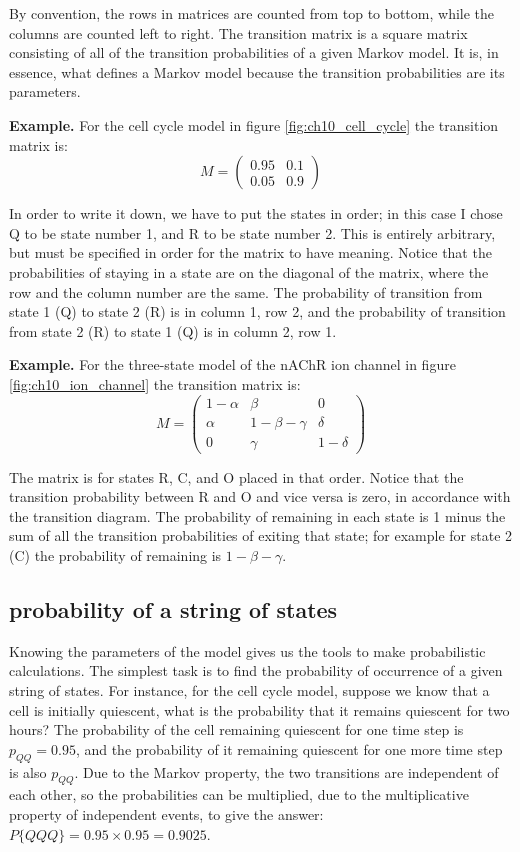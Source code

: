 \documentclass[
]{book}
\theoremstyle{definition}
\theoremstyle{definition}
\theoremstyle{definition}
\theoremstyle{remark}
\begin{document}
By convention, the rows in matrices are counted from top to bottom, while the columns are counted left to right. The transition matrix is a square matrix consisting of all of the transition probabilities of a given Markov model. It is, in essence, what defines a Markov model because the transition probabilities are its parameters.

\textbf{Example.} For the cell cycle model in figure \ref{fig:ch10_cell_cycle} the transition matrix is:
\[ 
M = \left(\begin{array}{cc}0.95 & 0.1 \\0.05 & 0.9\end{array}\right)
\]

In order to write it down, we have to put the states in order; in this case I chose Q to be state number 1, and R to be state number 2. This is entirely arbitrary, but must be specified in order for the matrix to have meaning. Notice that the probabilities of staying in a state are on the diagonal of the matrix, where the row and the column number are the same. The probability of transition from state 1 (Q) to state 2 (R) is in column 1, row 2, and the probability of transition from state 2 (R) to state 1 (Q) is in column 2, row 1.

\textbf{Example.} For the three-state model of the nAChR ion channel in figure \ref{fig:ch10_ion_channel} the transition matrix is:
\[ 
M = \left(\begin{array}{ccc} 1-\alpha & \beta & 0  \\ \alpha & 1-\beta-\gamma & \delta \\ 0 & \gamma & 1-\delta \end{array}\right)
\]

The matrix is for states R, C, and O placed in that order. Notice that the transition probability between R and O and vice versa is zero, in accordance with the transition diagram. The probability of remaining in each state is 1 minus the sum of all the transition probabilities of exiting that state; for example for state 2 (C) the probability of remaining is \(1-\beta-\gamma\).

\hypertarget{probability-of-a-string-of-states}{%
\subsection{probability of a string of states}\label{probability-of-a-string-of-states}}

Knowing the parameters of the model gives us the tools to make probabilistic calculations. The simplest task is to find the probability of occurrence of a given string of states. For instance, for the cell cycle model, suppose we know that a cell is initially quiescent, what is the probability that it remains quiescent for two hours? The probability of the cell remaining quiescent for one time step is \(p_{QQ} = 0.95\), and the probability of it remaining quiescent for one more time step is also \(p_{QQ}\). Due to the Markov property, the two transitions are independent of each other, so the probabilities can be multiplied, due to the multiplicative property of independent events, to give the answer: \(P\{QQQ\} = 0.95\times0.95 = 0.9025\).
\end{document}

